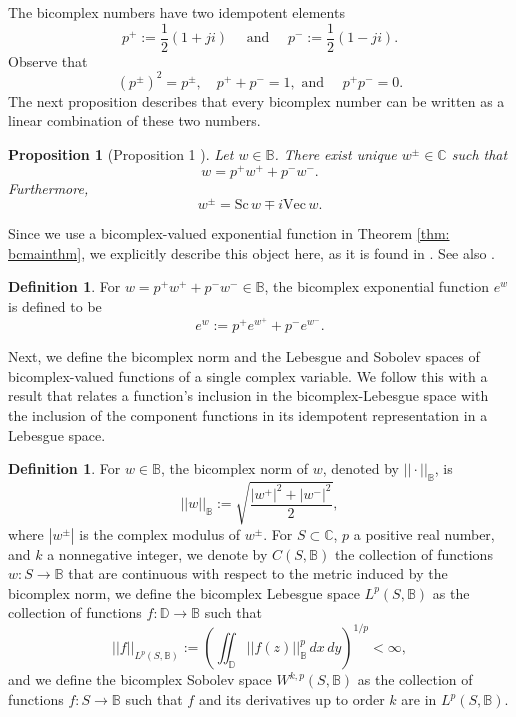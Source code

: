 \documentclass[12pt,reqno]{amsart}
\newtheorem{prop}[theorem]{Proposition}
\theoremstyle{definition}
\newtheorem{deff}[theorem]{Definition}
\theoremstyle{remark}
\newcommand{\C}{\mathbb C}
\newcommand{\bc}{\mathbb{B}}
\newcommand{\sca}{\text{Sc}\,}
\newcommand{\vect}{\text{Vec}\,}
\newcommand{\disk}{\mathbb{D}}
\begin{document}
            The bicomplex numbers have two idempotent elements
            \[
            p^+ := \frac{1}{2}(1 + ji) \quad \text{ and } \quad  p^- := \frac{1}{2}(1 - ji).
            \]
            Observe that 
            \[
                (p^\pm)^2 = p^\pm, \quad p^+ + p^- = 1, \text{ and } \quad p^+p^- = 0.
            \]
            The next proposition describes that every bicomplex number can be written as a linear combination of these two numbers. 

            \begin{prop}[Proposition 1 \cite{BCTransmutation}]\label{everybchasplusandminus}
                Let $w \in \bc$. There exist unique $w^{\pm} \in \C$ such that 
                \[
                    w = p^+ w^+ + p^- w^-.
                \]
                Furthermore, 
                \[
                    w^{\pm} = \sca w \mp i \vect w.
                \]
                \end{prop}

            Since we use a bicomplex-valued exponential function in Theorem \ref{thm: bcmainthm}, we explicitly describe this object here, as it is found in \cite{FundBicomplex}. See also \cite{BCHolo}.

            \begin{deff}
                For $w = p^+ w^+ + p^- w^- \in \bc$, the bicomplex exponential function $e^w$ is defined to be 
                \[
                    e^w := p^+ e^{w^+} + p^- e^{w^-}.
                \]
            \end{deff}

            

            Next, we define the bicomplex norm and the Lebesgue and Sobolev spaces of bicomplex-valued functions of a single complex variable. We follow this with a result that relates a function's inclusion in the bicomplex-Lebesgue space with the inclusion of the component functions in its idempotent representation in a Lebesgue space. 

            \begin{deff}
                For $w \in \bc$, the bicomplex norm of $w$, denoted by $||\cdot||_{\bc}$,  is
                \[
                    ||w||_{\bc} := \sqrt{\frac{|w^+|^2 + |w^-|^2}{2}},
                \]
                where $|w^{\pm}|$ is the complex modulus of $w^\pm$. For $S \subset \mathbb{C}$, $p$ a positive real number, and $k$ a nonnegative integer, we denote by $C(S, \bc)$ the collection of functions $w:S \to\bc$ that are continuous with respect to the metric induced by the bicomplex norm, we define the bicomplex Lebesgue space $L^p(S,\bc)$ as the collection of functions $f: \disk\to\bc$ such that
            \[
                ||f||_{L^p(S,\bc)} := \left( \iint_{\disk}||f(z)||^p_\bc\,dx\,dy\right)^{1/p} < \infty,
            \]  
            and we define the bicomplex Sobolev space $W^{k,p}(S,\bc)$ as the collection of functions $f: S\to\bc$ such that $f$ and its derivatives up to order $k$ are in $L^p(S,\bc)$. 
            \end{deff}
\end{document}

